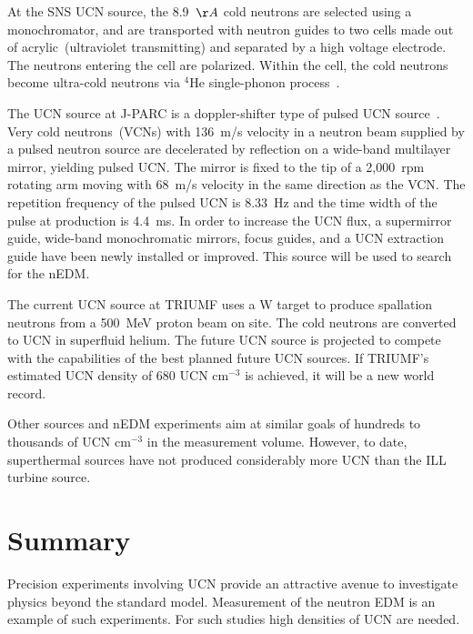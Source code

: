 At the SNS UCN source, the 8.9~$\AA$ cold neutrons are selected using
a monochromator, and are transported with neutron guides to two cells
made out of acrylic~(ultraviolet transmitting) and separated by a high
voltage electrode.  The neutrons entering the cell are
polarized. Within the cell, the cold neutrons become ultra-cold
neutrons via $^4$He single-phonon process~\cite{kolarkar2010}.


The UCN source at J-PARC is a doppler-shifter type of pulsed UCN
source~\cite{Imajo2015}. Very cold neutrons~(VCNs) with 136~m/s
velocity in a neutron beam supplied by a pulsed neutron source are
decelerated by reflection on a wide-band multilayer mirror, yielding
pulsed UCN. The mirror is fixed to the tip of a 2,000~rpm rotating arm
moving with 68~m/s velocity in the same direction as the VCN. The
repetition frequency of the pulsed UCN is 8.33~Hz and the time width
of the pulse at production is 4.4~ms. In order to increase the UCN
flux, a supermirror guide, wide-band monochromatic mirrors, focus
guides, and a UCN extraction guide have been newly installed or
improved. This source will be used to search for the nEDM.


The current UCN source at TRIUMF uses a W target to produce spallation
neutrons from a 500~MeV proton beam on site. The cold neutrons are
converted to UCN in superfluid helium.  The future UCN source is
projected to compete with the capabilities of the best planned future
UCN sources. If TRIUMF's estimated UCN density of 680 UCN cm$^{-3}$ is
achieved, it will be a new world record.

Other sources and nEDM experiments aim at similar goals of hundreds to
thousands of UCN cm$^{-3}$ in the measurement volume. However, to
date, superthermal sources have not produced considerably more UCN
than the ILL turbine source.


 



\section{Summary}
Precision experiments involving UCN provide an attractive avenue to
investigate physics beyond the standard model. Measurement of the
neutron EDM is an example of such experiments. For such studies high
densities of UCN are needed.

